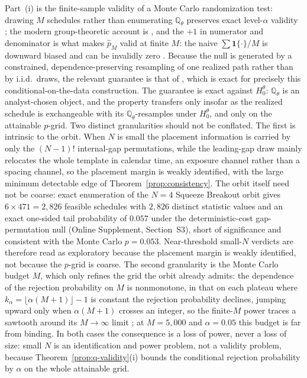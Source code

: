 \documentclass[preprint,12pt]{elsarticle}
\theoremstyle{definition}
\begin{document}
Part~(i) is the finite-sample validity of a Monte Carlo randomization test:
drawing $M$ schedules rather than enumerating $\mathbb{Q}_\theta$ preserves exact
level-$\alpha$ validity \cite{Dwass1957,Hope1968}; the modern group-theoretic
account is \cite{HemerikGoeman2018}, and the $+1$ in numerator and denominator is
what makes $\hat p_M$ valid at finite $M$: the naive $\sum\mathbf
1\{\cdot\}/M$ is downward biased and can be invalidly zero
\cite{PhipsonSmyth2010}. Because the null is generated by a constrained,
dependence-preserving resampling of one realized path rather than by i.i.d.\
draws, the relevant guarantee is that of \cite{BesagClifford1989}, which is exact
for precisely this conditional-on-the-data construction. The guarantee is exact
against $H_0^\theta$: $\mathbb{Q}_\theta$ is an analyst-chosen object, and the
property transfers only insofar as the realized schedule is exchangeable with its
$\mathbb{Q}_\theta$-resamples under $H_0^\theta$, and only on the attainable
$p$-grid. Two distinct granularities should not be conflated. The first is
intrinsic to the orbit. When $N$ is small the placement information is carried by only
the $(N-1)!$ internal-gap permutations, while the leading-gap draw mainly relocates the
whole template in calendar time, an exposure channel rather than a spacing channel, so
the placement margin is weakly identified, with the large minimum detectable edge of
Theorem~\ref{prop:consistency}. The orbit itself need not be coarse: exact enumeration
of the $N=4$ Squeeze Breakout orbit gives $6\times471=2{,}826$ feasible schedules with
$2{,}826$ distinct statistic values and an exact one-sided tail probability of $0.057$
under the deterministic-cost gap-permutation null (Online Supplement, Section~S3), short
of significance and consistent with the Monte Carlo $p=0.053$. Near-threshold small-$N$
verdicts are therefore read as exploratory because the placement margin is weakly
identified, not because the $p$-grid is coarse. The second granularity is
the Monte Carlo budget $M$, which only refines the grid the orbit already admits:
the dependence of the rejection probability on $M$ is nonmonotone, in that on each
plateau where $k_\alpha=\lfloor\alpha(M+1)\rfloor-1$ is constant the rejection
probability declines, jumping upward only when $\alpha(M+1)$ crosses an integer,
so the finite-$M$ power traces a sawtooth around its $M\to\infty$ limit
\cite{Hope1968}; at $M=5{,}000$ and $\alpha=0.05$ this budget is far from binding.
In both cases the consequence is a loss of power, never a
loss of size: small $N$ is an identification and power problem, not a validity problem,
because Theorem~\ref{prop:q-validity}(i) bounds the conditional rejection
probability by $\alpha$ on the whole attainable grid.
\end{document}
